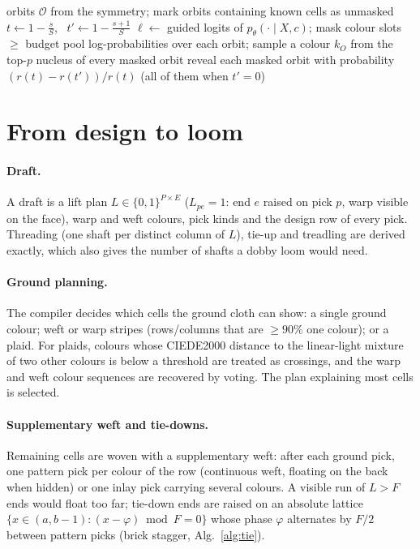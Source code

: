 \documentclass[11pt]{article}
\begin{document}
\begin{algorithm}[t]
\caption{Orbit-pooled sampling}\label{alg:sample}
\begin{algorithmic}[1]
\State orbits $\mathcal{O}$ from the symmetry; mark orbits containing known cells as unmasked
  \State $t \gets 1-\tfrac{s}{S}$, \ $t' \gets 1-\tfrac{s+1}{S}$
  \State $\ell \gets$ guided logits of $p_\theta(\cdot\mid X, c)$; mask colour slots $\ge$ budget
  \State pool log-probabilities over each orbit; sample a colour $k_O$ from the top-$p$ nucleus of every masked orbit
  \State reveal each masked orbit with probability $(r(t)-r(t'))/r(t)$ (all of them when $t'=0$)
\EndFor
\end{algorithmic}
\end{algorithm}

\section{From design to loom}
\label{sec:compiler}

\paragraph{Draft.}
A draft is a lift plan $L\in\{0,1\}^{P\times E}$ ($L_{pe}=1$: end $e$ raised on pick $p$, warp
visible on the face), warp and weft colours, pick kinds and the design row of every pick. Threading
(one shaft per distinct column of $L$), tie-up and treadling are derived exactly, which also gives
the number of shafts a dobby loom would need.

\paragraph{Ground planning.}
The compiler decides which cells the ground cloth can show: a single ground colour; weft or warp
stripes (rows/columns that are $\ge 90\%$ one colour); or a plaid. For plaids, colours whose CIEDE2000
\cite{sharma2005ciede2000} distance to the linear-light mixture of two other colours is below a
threshold are treated as crossings, and the warp and weft colour sequences are recovered by voting.
The plan explaining most cells is selected.

\paragraph{Supplementary weft and tie-downs.}
Remaining cells are woven with a supplementary weft: after each ground pick, one pattern pick per
colour of the row (continuous weft, floating on the back when hidden) or one inlay pick carrying
several colours. A visible run of $L>F$ ends would float too far; tie-down ends are raised on an
absolute lattice $\{x\in(a,b-1):(x-\varphi)\bmod F=0\}$ whose phase $\varphi$ alternates by $F/2$
between pattern picks (brick stagger, Alg.~\ref{alg:tie}).
\end{document}
